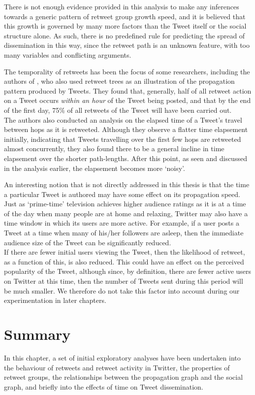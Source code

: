 There is not enough evidence provided in this analysis to make any inferences towards a generic pattern of retweet group growth speed, and it is believed that this growth is governed by many more factors than the Tweet itself or the social structure alone. As such, there is no predefined rule for predicting the spread of dissemination in this way, since the retweet path is an unknown feature, with too many variables and conflicting arguments.

The temporality of retweets has been the focus of some researchers, including the authors of \cite{kwak10}, who also used retweet trees as an illustration of the propagation pattern produced by Tweets. They found that, generally, half of all retweet action on a Tweet occurs \textit{within an hour} of the Tweet being posted, and that by the end of the first day, 75\% of all retweets of the Tweet will have been carried out.\\
The authors also conducted an analysis on the elapsed time of a Tweet's travel between hops as it is retweeted. Although they observe a flatter time elapsement initially, indicating that Tweets travelling over the first few hops are retweeted almost concurrently, they also found there to be a general incline in time elapsement over the shorter path-lengths. After this point, as seen and discussed in the analysis earlier, the elapsement becomes more `noisy'. 

An interesting notion that is not directly addressed in this thesis is that the time a particular Tweet is authored may have some effect on its propagation speed. Just as `prime-time' television achieves higher audience ratings as it is at a time of the day when many people are at home and relaxing, Twitter may also have a time window in which its users are more active. For example, if a user posts a Tweet at a time when many of his/her followers are asleep, then the immediate audience size of the Tweet can be significantly reduced.\\
If there are fewer initial users viewing the Tweet, then the likelihood of retweet, as a function of this, is also reduced. This could have an effect on the perceived popularity of the Tweet, although since, by definition, there are fewer active users on Twitter at this time, then the number of Tweets sent during this period will be much smaller. We therefore do not take this factor into account during our experimentation in later chapters.


\section{Summary}
In this chapter, a set of initial exploratory analyses have been undertaken into the behaviour of retweets and retweet activity in Twitter, the properties of retweet groups, the relationships between the propagation graph and the social graph, and briefly into the effects of time on Tweet dissemination.

